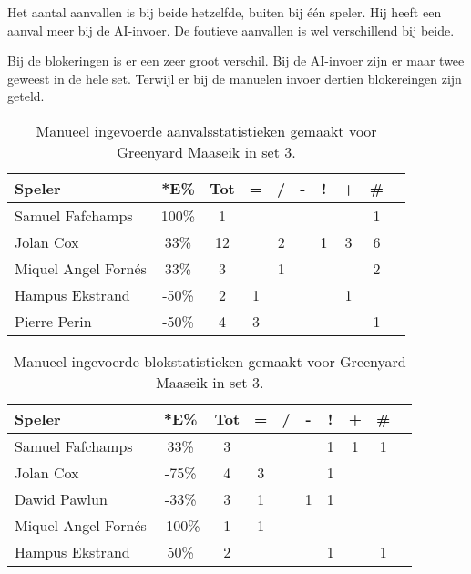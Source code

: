 Het aantal aanvallen is bij beide hetzelfde, buiten bij één speler. Hij heeft een aanval meer bij de AI-invoer. De foutieve aanvallen is wel verschillend bij beide.

Bij de blokeringen is er een zeer groot verschil. Bij de AI-invoer zijn er maar twee geweest in de hele set. Terwijl er bij de manuelen invoer dertien blokereingen zijn geteld.

\begin{table}[ht!]
    \centering
    \scriptsize
    \begin{tabular}{|l|c|c|c|c|c|c|c|c|c|} \hline
        \textbf{Speler} & *E\% & Tot & = & / & - & ! & + & \#\\ \hline
        Samuel Fafchamps & 100\% & 1 &  &  &  &  &  & 1 \\ 
        Jolan Cox & 33\% & 12 &  & 2 &  & 1 & 3 & 6 \\ 
        Miquel Angel Fornés & 33\% & 3 &  & 1 &  &  &  & 2 \\ 
        Hampus Ekstrand & -50\% & 2 & 1 &  &  &  & 1 & \\ 
        Pierre Perin & -50\% & 4 & 3 &  &  &  &  & 1 \\ \hline
    \end{tabular}
    \caption[Manueel ingevoerde aanvalsstatistieken gemaakt Greenyard Maaseik in set 3]{\label{tab:PL3AttMaaseikMan3}Manueel ingevoerde aanvalsstatistieken gemaakt voor Greenyard Maaseik in set 3.}
\end{table}

\begin{table}[ht!]
    \centering
    \scriptsize
    \begin{tabular}{|l|c|c|c|c|c|c|c|c|c|} \hline
        \textbf{Speler} & *E\% & Tot & = & / & - & ! & + & \#\\ \hline
        Samuel Fafchamps & 33\% & 3 &  &  &  & 1 & 1 & 1 \\ 
        Jolan Cox & -75\% & 4 & 3 &  &  & 1 &  & \\ 
        Dawid Pawlun & -33\% & 3 & 1 &  & 1 & 1 &  &  \\ 
        Miquel Angel Fornés & -100\% & 1 & 1 &  &  &  &  & \\ 
        Hampus Ekstrand & 50\% & 2 &  &  &  & 1 &  & 1 \\  \hline
    \end{tabular}
    \caption[Manueel ingevoerde blokstatistieken gemaakt Greenyard Maaseik in set 3]{\label{tab:PL3BlockMaaseikMan3}Manueel ingevoerde blokstatistieken gemaakt voor Greenyard Maaseik in set 3.}
\end{table}

